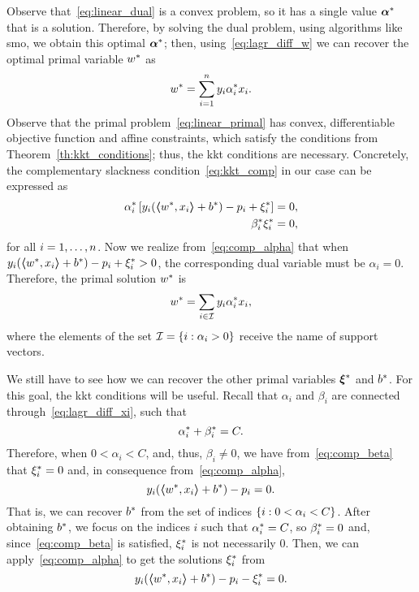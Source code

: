 %
Observe that~\eqref{eq:linear_dual} is a convex problem, so it has a single value ${\bm{\alpha}}^*$ that is a solution. Therefore, by solving the dual problem, using algorithms like \acrshort{smo}, we obtain this optimal ${\bm{\alpha}}^*$; then, using~\eqref{eq:lagr_diff_w} we can recover the optimal primal variable ${w}^*$ as 
\begin{equation}
    \nonumber
    {w}^* = \sum_{i=1}^n y_i {\alpha}^*_i x_i .
\end{equation}
%
Observe that the primal problem~\eqref{eq:linear_primal} has convex, differentiable objective function and affine constraints, which satisfy the conditions from Theorem~\ref{th:kkt_conditions}; thus, the \acrshort{kkt} conditions are necessary.
%
Concretely, the complementary slackness condition~\eqref{eq:kkt_comp} in our case can be expressed as
\begin{align}
    \opt{\alpha}_i \left[ y_i (\dotp{\opt{w}}{x_i} + \opt{b}) - p_i + \opt{\xi}_i \right] = 0 , \label{eq:comp_alpha} \\
    \opt{\beta}_i \opt{\xi}_i = 0 , \label{eq:comp_beta}
\end{align}
for all $i=1, \ldots, n$. 
Now we realize from~\eqref{eq:comp_alpha} that when $y_i (\bm{\left\langle} {w}^*, x_i \bm{\right\rangle} + {b}^*) - p_i + {\xi}^*_i > 0$, the corresponding dual variable must be $\alpha_i = 0$. Therefore, the primal solution ${w}^*$ is 
\begin{equation}
    \nonumber
    {w}^* = \sum_{i \in \mathcal{I}} y_i {\alpha}^*_i x_i ,
\end{equation}
where the elements of the set $\mathcal{I} = \left\{i: \alpha_i > 0\right\}$ receive the name of support vectors.
%

We still have to see how we can recover the other primal variables ${\bm{\xi}}^*$ and ${b}^*$. For this goal, the \acrshort{kkt} conditions will be useful.
Recall that $\alpha_i$ and $\beta_i$ are connected through~\eqref{eq:lagr_diff_xi}, such that 
$$ {\alpha}^*_i + {\beta}^*_i = C .$$
Therefore, when $0 < \alpha_i < C$, and, thus, $\beta_i \neq 0$, we have from~\eqref{eq:comp_beta} that ${\xi}^*_i = 0$ and, in consequence from~\eqref{eq:comp_alpha},
\begin{equation}
    \nonumber
    y_i (\bm{\left\langle} {w}^*, x_i \bm{\right\rangle} + {b}^*) - p_i = 0 .
\end{equation}
That is, we can recover ${b}^*$ from the set of indices $\left\{i: 0 < \alpha_i < C\right\}$.
%
After obtaining ${b}^*$, we focus on the indices $i$ such that ${\alpha}^*_i = C$, so ${\beta}^*_i = 0$ and, since~\eqref{eq:comp_beta} is satisfied, ${\xi}^*_i$ is not necessarily $0$. Then, we can apply~\eqref{eq:comp_alpha} to get the solutions ${\xi}^*_i$ from 
\begin{equation}
    \nonumber
    y_i (\bm{\left\langle} {w}^*, x_i \bm{\right\rangle} + {b}^*) - p_i - {\xi}^*_i = 0 .
\end{equation}


